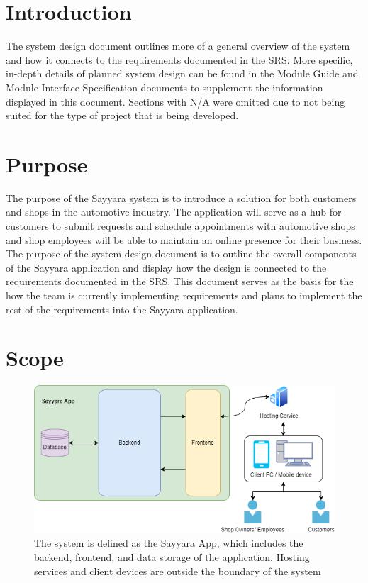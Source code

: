 \documentclass[12pt, titlepage]{article}
\begin{document}
\listoftables

\listoffigures

\newpage


\section{Introduction}

The system design document outlines more of a general overview of the system and how it connects to the requirements documented in the SRS. More specific, in-depth details of planned system design can be found in the Module Guide and Module Interface Specification documents to supplement the information displayed in this document. Sections with N/A were omitted due to not being suited for the type of project that is being developed.

\section{Purpose}

The purpose of the Sayyara system is to introduce a solution for both customers and shops in the automotive industry. The application will serve as a hub for customers to submit requests and schedule appointments with automotive shops and shop employees will be able to maintain an online presence for their business. The purpose of the system design document is to outline the overall components of the Sayyara application and display how the design is connected to the requirements documented in the SRS. This document serves as the basis for the how the team is currently implementing requirements and plans to implement the rest of the requirements into the Sayyara application.

\section{Scope}
\begin{figure}[H]
    \centering
    \includegraphics[scale=0.6]{Design/SystDesign/scope.png}
    \caption{The system is defined as the Sayyara App, which includes the backend, frontend, and data storage of the application. Hosting services and client devices are outside the boundary of the system}
    \label{fig:scope}
\end{figure}
\end{document}
